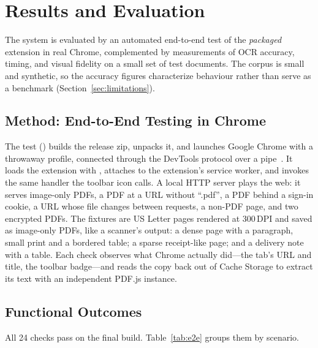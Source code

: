 \section{Results and Evaluation}
\label{sec:results}

The system is evaluated by an automated end-to-end test of the \emph{packaged}
extension in real Chrome, complemented by measurements of OCR accuracy, timing,
and visual fidelity on a small set of test documents. The corpus is small and
synthetic, so the accuracy figures characterize behaviour rather than serve as a
benchmark (Section~\ref{sec:limitations}).

\subsection{Method: End-to-End Testing in Chrome}
The test () builds the release zip, unpacks it, and
launches Google Chrome with a throwaway profile, connected through the DevTools
protocol over a pipe~\cite{cdp}. It loads the extension with
, attaches to the extension's service worker,
and invokes the same handler the toolbar icon calls. A local HTTP server plays
the web: it serves image-only PDFs, a PDF at a URL without ``.pdf'', a PDF behind
a sign-in cookie, a URL whose file changes between requests, a non-PDF page, and
two encrypted PDFs. The fixtures are US Letter pages rendered at 300\,DPI and
saved as image-only PDFs, like a scanner's output: a dense page with a paragraph,
small print and a bordered table; a sparse receipt-like page; and a delivery note
with a table. Each check observes what Chrome actually did---the tab's URL and
title, the toolbar badge---and reads the copy back out of Cache Storage to
extract its text with an independent PDF.js instance.

\subsection{Functional Outcomes}
All 24 checks pass on the final build. Table~\ref{tab:e2e} groups them by
scenario.

